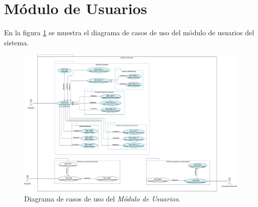 	
	

	
	
	
	
	

	
	

	
	

	
	

	\clearpage
\section{Módulo de Usuarios}
	En la figura \ref{adcu:usr} se muestra el diagrama de casos de uso del módulo de usuarios del sistema.

	\begin{figure}[hbtp!]
		\begin{center}
			\includegraphics[width=1 \textwidth]{anexos/imagenes/CUUSR.png}
		\end{center}
		
		\caption{Diagrama de casos de uso del \textit{Módulo de Usuarios}.}
		\label{adcu:usr}
	\end{figure}

	
	

	
	
	
	
	
	

